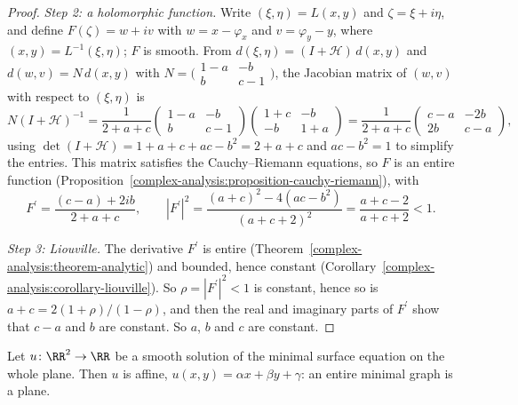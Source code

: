 \begin{proof}
\emph{Step 2: a holomorphic function.} Write $(\xi, \eta) = L(x, y)$ and $\zeta = \xi + i\eta$, and define $F(\zeta) = w + iv$ with $w = x - \varphi_x$ and $v = \varphi_y - y$,
where $(x, y) = L^{-1}(\xi, \eta)$; $F$ is smooth. From $d(\xi, \eta) = (I + \mathcal{H})\,d(x, y)$ and $d(w, v) = N\,d(x, y)$ with
$N = \bigl(\begin{smallmatrix} 1 - a & -b\\ b & c - 1\end{smallmatrix}\bigr)$, the Jacobian matrix of $(w, v)$ with respect to $(\xi, \eta)$ is
\[
N(I + \mathcal{H})^{-1} = \frac1{2 + a + c}\begin{pmatrix} 1 - a & -b\\ b & c - 1\end{pmatrix}\begin{pmatrix} 1 + c & -b\\ -b & 1 + a\end{pmatrix}
= \frac1{2 + a + c}\begin{pmatrix} c - a & -2b\\ 2b & c - a\end{pmatrix},
\]
using $\det(I + \mathcal{H}) = 1 + a + c + ac - b^2 = 2 + a + c$ and $ac - b^2 = 1$ to simplify the entries. This matrix satisfies the Cauchy--Riemann equations, so $F$ is an
entire function (Proposition~\ref{complex-analysis:proposition-cauchy-riemann}), with
\[
F^{\prime} = \frac{(c - a) + 2ib}{2 + a + c}, \qquad |F^{\prime}|^2 = \frac{(a + c)^2 - 4(ac - b^2)}{(a + c + 2)^2} = \frac{a + c - 2}{a + c + 2} < 1 .
\]

\emph{Step 3: Liouville.} The derivative $F^{\prime}$ is entire (Theorem~\ref{complex-analysis:theorem-analytic}) and bounded, hence constant
(Corollary~\ref{complex-analysis:corollary-liouville}). So $\rho = |F^{\prime}|^2 < 1$ is constant, hence so is $a + c = 2(1 + \rho)/(1 - \rho)$, and then the real and imaginary parts
of $F^{\prime}$ show that $c - a$ and $b$ are constant. So $a$, $b$ and $c$ are constant.
\end{proof}

\begin{theorem}[Bernstein]\label{riemannian-geometry:theorem-bernstein}
Let $u \colon \RR^2 \to \RR$ be a smooth solution of the minimal surface equation on the whole plane. Then $u$ is affine, $u(x, y) = \alpha x + \beta y + \gamma$: an entire
minimal graph is a plane.
\end{theorem}

